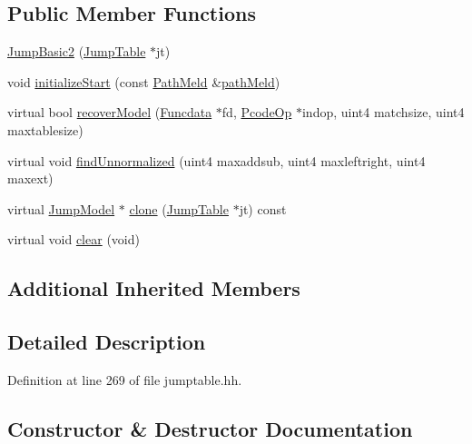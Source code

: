 \subsection*{Public Member Functions}
\begin{DoxyCompactItemize}
\item 
\mbox{\hyperlink{class_jump_basic2_aa9826f7bb3b605eaed7c079b39358af7}{Jump\+Basic2}} (\mbox{\hyperlink{class_jump_table}{Jump\+Table}} $\ast$jt)
\item 
void \mbox{\hyperlink{class_jump_basic2_ac228c931935854c24c0e4d7893e93510}{initialize\+Start}} (const \mbox{\hyperlink{class_path_meld}{Path\+Meld}} \&\mbox{\hyperlink{class_jump_basic_aade10e6498d3f6146674b7b9ae1938e5}{path\+Meld}})
\item 
virtual bool \mbox{\hyperlink{class_jump_basic2_adc60ecb0d804d1a7754161b38ae3299f}{recover\+Model}} (\mbox{\hyperlink{class_funcdata}{Funcdata}} $\ast$fd, \mbox{\hyperlink{class_pcode_op}{Pcode\+Op}} $\ast$indop, uint4 matchsize, uint4 maxtablesize)
\item 
virtual void \mbox{\hyperlink{class_jump_basic2_ab5d1cebab5d2f98d0caf6fc551b29980}{find\+Unnormalized}} (uint4 maxaddsub, uint4 maxleftright, uint4 maxext)
\item 
virtual \mbox{\hyperlink{class_jump_model}{Jump\+Model}} $\ast$ \mbox{\hyperlink{class_jump_basic2_a8d19ff3f441509f74402fdbefabb0801}{clone}} (\mbox{\hyperlink{class_jump_table}{Jump\+Table}} $\ast$jt) const
\item 
virtual void \mbox{\hyperlink{class_jump_basic2_a5eb65ff4a67499c48f720462d65f8152}{clear}} (void)
\end{DoxyCompactItemize}
\subsection*{Additional Inherited Members}


\subsection{Detailed Description}


Definition at line 269 of file jumptable.\+hh.



\subsection{Constructor \& Destructor Documentation}
\mbox{\label{class_jump_basic2_aa9826f7bb3b605eaed7c079b39358af7}} 
